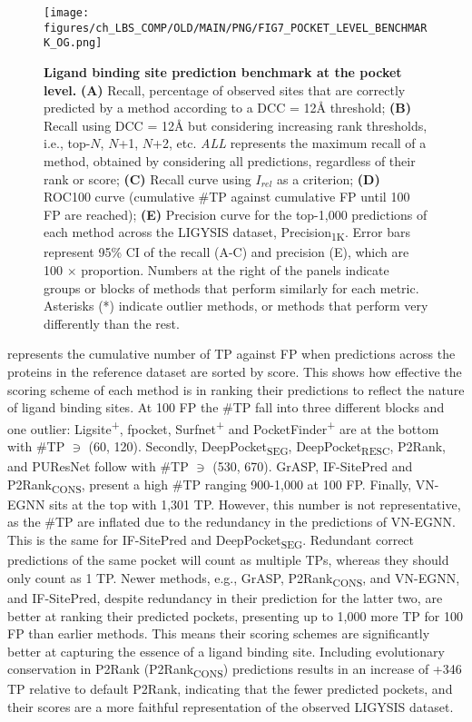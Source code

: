 \begin{figure}[ht!]
    \centering
    \texttt{[image: figures/ch\_LBS\_COMP/OLD/MAIN/PNG/FIG7\_POCKET\_LEVEL\_BENCHMARK\_OG.png]}
    \caption[Ligand binding site prediction benchmark at the pocket level]{\textbf{Ligand binding site prediction benchmark at the pocket level.} \textbf{(A)} Recall, percentage of observed sites that are correctly predicted by a method according to a DCC = 12\AA{} threshold; \textbf{(B)} Recall using DCC = 12\AA{} but considering increasing rank thresholds, i.e., top-$N$, $N$+1, $N$+2, etc. \textit{ALL} represents the maximum recall of a method, obtained by considering all predictions, regardless of their rank or score; \textbf{(C)} Recall curve using $I_{rel}$ as a criterion; \textbf{(D)} ROC100 curve  (cumulative \#TP against cumulative FP until 100 FP are reached); \textbf{(E)} Precision curve for the top-1,000 predictions of each method across the LIGYSIS dataset, Precision\textsubscript{1K}. Error bars represent 95\% CI of the recall (A-C) and precision (E), which are 100 $\times$ proportion. Numbers at the right of the panels indicate groups or blocks of methods that perform similarly for each metric. Asterisks (*) indicate outlier methods, or methods that perform very differently than the rest.}
    \label{fig:pocket_level_benchmark_OG}
\end{figure}

 represents the cumulative number of TP against FP when predictions across the proteins in the reference dataset are sorted by score. This shows how effective the scoring scheme of each method is in ranking their predictions to reflect the nature of ligand binding sites. At 100 FP the \#TP fall into three different blocks and one outlier: Ligsite\textsuperscript{+}, fpocket, Surfnet\textsuperscript{+} and PocketFinder\textsuperscript{+} are at the bottom with \#TP $\ni$ (60, 120). Secondly, DeepPocket\textsubscript{SEG}, DeepPocket\textsubscript{RESC}, P2Rank, and PUResNet follow with \#TP $\ni$ (530, 670). GrASP, IF-SitePred and P2Rank\textsubscript{CONS}, present a high \#TP ranging 900-1,000 at 100 FP. Finally, VN-EGNN sits at the top with 1,301 TP. However, this number is not representative, as the \#TP are inflated due to the redundancy in the predictions of VN-EGNN. This is the same for IF-SitePred and DeepPocket\textsubscript{SEG}. Redundant correct predictions of the same pocket will count as multiple TPs, whereas they should only count as 1 TP. Newer methods, e.g., GrASP, P2Rank\textsubscript{CONS}, and VN-EGNN, and IF-SitePred, despite redundancy in their prediction for the latter two, are better at ranking their predicted pockets, presenting up to 1,000 more TP for 100 FP than earlier methods. This means their scoring schemes are significantly better at capturing the essence of a ligand binding site. Including evolutionary conservation in P2Rank (P2Rank\textsubscript{CONS}) predictions results in an increase of +346 TP relative to default P2Rank, indicating that the fewer predicted pockets, and their scores are a more faithful representation of the observed LIGYSIS dataset.

